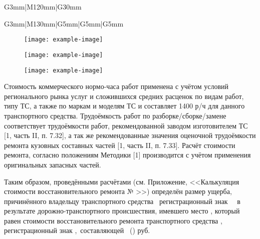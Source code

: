 \begin{longtable}{G{3mm}|M{120mm}|G{30mm}}
\begin{longtable}{G{3mm}|M{130mm}|G{5mm}|G{5mm}|G{5mm}}
\begin{figure}[H]
	\centering
	\texttt{[image: example-image]}
\end{figure}

%
\begin{figure}[H]
	\centering
	\texttt{[image: example-image]}
\end{figure}
\begin{figure}[H]
	\centering
	\texttt{[image: example-image]}
\end{figure}
\medskip
\renewcommand\baselinestretch{1.2}\small\normalsize
Стоимость коммерческого нормо-часа работ применена  с учётом условий регионального рынка услуг и сложившихся средних расценок по видам работ, типу ТС, а также по маркам и моделям ТС  и   составляет 1400 р/ч для данного транспортного средства.  Трудоёмкость работ по разборке/сборке/замене  соответствует трудоёмкости работ, рекомендованной заводом изготовителем ТС [1, часть II, п. 7.32], а так же рекомендованные значения оценочной трудоёмкости ремонта кузовных составных частей [1, часть II, п. 7.33]. Расчёт стоимости ремонта, согласно положениям Методики [1] производится с учётом  применения оригинальных запасных частей. %
%
\par Таким образом,   проведёнными расчётами (см. Приложение, <<Калькуляция стоимости восстановительного ремонта № \NomerDoc>>) определён размер ущерба, причинённого владельцу  транспортного средства \tc\, регистрационный знак \, \, в результате дорожно-транспортного происшествия, имевшего место , который  равен стоимости восстановительного ремонта транспортного средства  , регистрационный  знак ,\, составляющей \, ()  руб.


%


\end{longtable}
\end{longtable}
